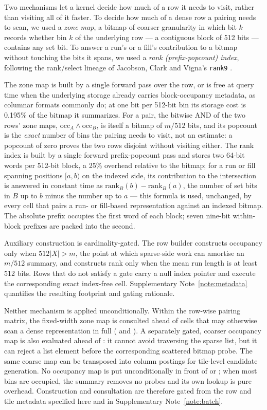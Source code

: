 Two mechanisms let a kernel decide how much of a row it needs to visit, rather than visiting all of it
faster. To decide how much of a dense row a pairing needs to scan, we used a \emph{zone map}, a
bitmap of coarser granularity in which bit $k$ records whether bin $k$ of the underlying row --- a
contiguous block of 512 bits --- contains any set bit. To answer a run's
or a fill's contribution to a bitmap without touching the bits it spans, we used a \emph{rank
(prefix-popcount) index}, following the rank/select lineage of Jacobson, Clark and Vigna's
\texttt{rank9} \cite{jacobson1989succinct,clark1996compact,vigna2008broadword}.

The zone map is built by a single forward pass over the row, or is free at query time when the
underlying storage already carries block-occupancy metadata, as columnar formats commonly do; at one
bit per 512-bit bin its storage cost is 0.195\% of the bitmap it summarizes. For a pair, the bitwise
AND of the two rows' zone maps, $\mathrm{occ}_A \wedge
\mathrm{occ}_B$, is itself a bitmap of $m/512$ bits, and its popcount is
the \emph{exact} number of bins the pairing needs to visit, not an estimate: a popcount of zero proves
the two rows disjoint without visiting either. The rank index is built by a single forward
prefix-popcount pass and stores two 64-bit words per 512-bit block, a 25\% overhead relative to the
bitmap; for a run or fill spanning positions $[a,b)$ on the indexed side, its
contribution to the intersection is answered in constant time as
$\mathrm{rank}_B(b) - \mathrm{rank}_B(a)$, the number of set bits in $B$ up to $b$ minus the number up
to $a$ --- this formula is used, unchanged, by every cell that pairs a run- or fill-based
representation against an indexed bitmap. The absolute prefix occupies the first word of each block;
seven nine-bit within-block prefixes are packed into the second.

Auxiliary construction is cardinality-gated. The row builder constructs occupancy only when
$512|X|>m$, the point at which sparse-side work can amortise an $m/512$ summary, and constructs rank
only when the mean run length is at least 512 bits. Rows that do not satisfy a gate carry a null index
pointer and execute the corresponding exact index-free cell. Supplementary
Note~\ref{note:metadata} quantifies the resulting footprint and gating rationale.

Neither mechanism is applied unconditionally. Within the row-wise pairing matrix, the fixed-width
zone map is consulted ahead of cells that may otherwise scan a dense representation in full
(\cell{\rB}{\rB} and \cell{\rB}{\rW}). A separately gated, coarser occupancy map is also evaluated
ahead of \cell{\rB}{\rS}: it cannot avoid traversing the sparse list, but it can reject a list element
before the corresponding scattered bitmap probe. The same coarse map can be transposed into column
postings for tile-level candidate generation. No occupancy map is put unconditionally in front of
\cell{\rB}{\rS} or \cell{\rB}{\rR}; when most bins are occupied, the summary removes no probes and
its own lookup is pure overhead. Construction and consultation are therefore gated from the row and
tile metadata specified here and in Supplementary Note~\ref{note:batch}.

